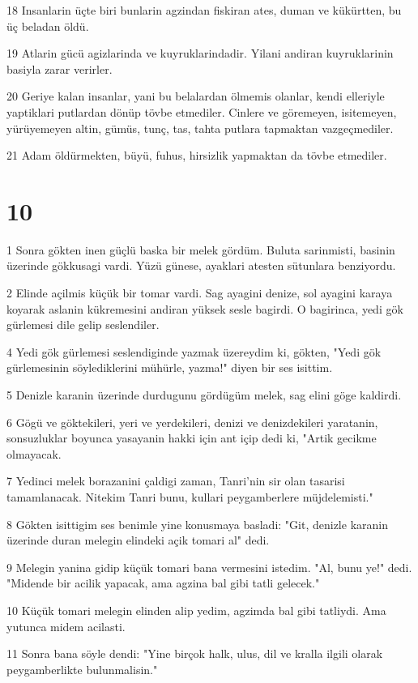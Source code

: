 \par 18 Insanlarin üçte biri bunlarin agzindan fiskiran ates, duman ve kükürtten, bu üç beladan öldü.
\par 19 Atlarin gücü agizlarinda ve kuyruklarindadir. Yilani andiran kuyruklarinin basiyla zarar verirler.
\par 20 Geriye kalan insanlar, yani bu belalardan ölmemis olanlar, kendi elleriyle yaptiklari putlardan dönüp tövbe etmediler. Cinlere ve göremeyen, isitemeyen, yürüyemeyen altin, gümüs, tunç, tas, tahta putlara tapmaktan vazgeçmediler.
\par 21 Adam öldürmekten, büyü, fuhus, hirsizlik yapmaktan da tövbe etmediler.

\chapter{10}

\par 1 Sonra gökten inen güçlü baska bir melek gördüm. Buluta sarinmisti, basinin üzerinde gökkusagi vardi. Yüzü günese, ayaklari atesten sütunlara benziyordu.
\par 2 Elinde açilmis küçük bir tomar vardi. Sag ayagini denize, sol ayagini karaya koyarak aslanin kükremesini andiran yüksek sesle bagirdi. O bagirinca, yedi gök gürlemesi dile gelip seslendiler.
\par 4 Yedi gök gürlemesi seslendiginde yazmak üzereydim ki, gökten, "Yedi gök gürlemesinin söylediklerini mühürle, yazma!" diyen bir ses isittim.
\par 5 Denizle karanin üzerinde durdugunu gördügüm melek, sag elini göge kaldirdi.
\par 6 Gögü ve göktekileri, yeri ve yerdekileri, denizi ve denizdekileri yaratanin, sonsuzluklar boyunca yasayanin hakki için ant içip dedi ki, "Artik gecikme olmayacak.
\par 7 Yedinci melek borazanini çaldigi zaman, Tanri'nin sir olan tasarisi tamamlanacak. Nitekim Tanri bunu, kullari peygamberlere müjdelemisti."
\par 8 Gökten isittigim ses benimle yine konusmaya basladi: "Git, denizle karanin üzerinde duran melegin elindeki açik tomari al" dedi.
\par 9 Melegin yanina gidip küçük tomari bana vermesini istedim. "Al, bunu ye!" dedi. "Midende bir acilik yapacak, ama agzina bal gibi tatli gelecek."
\par 10 Küçük tomari melegin elinden alip yedim, agzimda bal gibi tatliydi. Ama yutunca midem acilasti.
\par 11 Sonra bana söyle dendi: "Yine birçok halk, ulus, dil ve kralla ilgili olarak peygamberlikte bulunmalisin."


